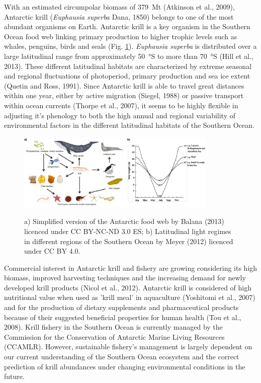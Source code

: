 With an estimated circumpolar biomass of \SI{379}{\mega\tonne} (Atkinson et al., 2009),
Antarctic krill (\textit{Euphausia superba} Dana, 1850) belongs to one of the
most abundant organisms on Earth. Antarctic krill is a key organism in the
Southern Ocean food web linking primary production to higher trophic levels
such as whales, penguins, birds and seals (Fig. \ref{figure1}). \textit{Euphausia superba}
is distributed over a large latitudinal range from approximately \SI{50}{\degree}S
to more than \SI{70}{\degree}S (Hill et al., 2013). These different latitudinal
habitats are characterized by extreme seasonal and regional fluctuations of
photoperiod, primary production and sea ice extent (Quetin and Ross, 1991).
Since Antarctic krill is able to travel great distances within one year, either
by active migration (Siegel, 1988) or passive transport within ocean currents
(Thorpe et al., 2007), it seems to be highly flexible in adjusting it's
phenology to both the high annual and regional variability of environmental
factors in the different latitudinal habitats of the Southern Ocean.

\begin{figure}
        \caption{a) Simplified version of the Antarctic food web by Balana
        (2013) licenced under CC BY-NC-ND 3.0 ES; b) Latitudinal light regimes
        in different regions of the Southern Ocean by Meyer (2012) licenced
        under CC BY 4.0.}
        \centering
        \includegraphics[width=0.85\textwidth]{../Figures/Figure1.pdf}
        \label{figure1}
\end{figure}

Commercial interest in Antarctic krill and fishery are growing considering its
high biomass, improved harvesting techniques and the increasing demand for
newly developed krill products (Nicol et al., 2012). Antarctic krill is
considered of high nutritional value when used as 'krill meal' in aquaculture
(Yoshitomi et al., 2007) and for the production of dietary supplements and
pharmaceutical products because of their suggested beneficial properties for
human health (Tou et al., 2008). Krill fishery in the Southern Ocean is
currently managed by the Commission for the Conservation of Antarctic Marine
Living Resources (CCAMLR). However, sustainable fishery's management is largely
dependent on our current understanding of the Southern Ocean ecosystem and the
correct prediction of krill abundances under changing environmental conditions
in the future.

